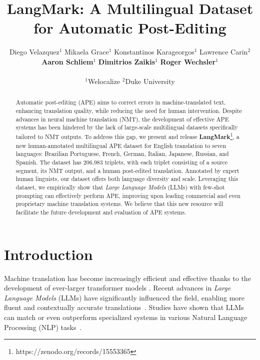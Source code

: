 \documentclass[11pt]{article}
\title{LangMark: A Multilingual Dataset for Automatic Post-Editing}
\author{%
  Diego Velazquez$^{1}$\quad
  Mikaela Grace$^{1}$\quad
  Konstantinos Karageorgos$^{1}$\quad
  Lawrence Carin$^{2}$\\
  \textbf{Aaron Schliem}$^{1}$\quad
  \textbf{Dimitrios Zaikis}$^{1}$\quad
  \textbf{Roger Wechsler}$^{1}$\quad \\ \\
  {
    $^1$Welocalize\hspace{1em}
    $^2$Duke University
  }
}
\theoremstyle{plain}
\theoremstyle{definition}
\theoremstyle{remark}
\begin{document}
\maketitle






\begin{abstract}
Automatic post-editing (APE) aims to correct errors in machine-translated text, enhancing translation quality, while reducing the need for human intervention. Despite advances in neural machine translation (NMT), the development of effective APE systems has been hindered by the lack of large-scale multilingual datasets specifically tailored to NMT outputs. To address this gap, we present and release  \textbf{LangMark}\footnote{https://zenodo.org/records/15553365}, a new human-annotated multilingual APE dataset for English translation to seven languages: Brazilian Portuguese, French, German, Italian, Japanese, Russian, and Spanish. The dataset has 206,983 triplets, with each triplet consisting of a source segment, its NMT output, and a human post-edited translation. Annotated by expert human linguists, our dataset offers both language diversity and scale.
Leveraging this dataset, we empirically show that \emph{Large Language Models} (LLMs) with few-shot prompting can effectively perform APE, improving upon leading commercial and even proprietary machine translation systems. We believe that this new resource will facilitate the future development and evaluation of APE systems.
\end{abstract}


\section{Introduction}
Machine translation has become increasingly efficient and effective thanks to the development of ever-larger transformer models \citep{vaswani2017attention}. Recent advances in \emph{Large Language Models} (LLMs) have significantly influenced the field, enabling more fluent and contextually accurate translations~\citep{zhu-etal-2024-multilingual, zhang-etal-2023-machine, li-etal-2024-towards-demonstration, briakou2024translating}. Studies have shown that LLMs can match or even outperform specialized systems in various Natural Language Processing (NLP) tasks~\citep{radford2019language, touvron2023llama, wang2022language}.
\end{document}
